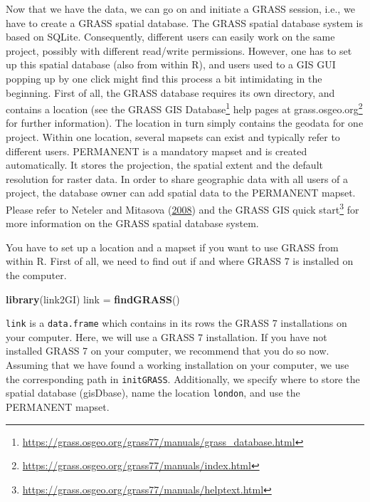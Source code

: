 \documentclass[]{krantz}
\newenvironment{Shaded}{\begin{snugshade}}{\end{snugshade}}
\newcommand{\KeywordTok}[1]{\textcolor[rgb]{0.27,0.27,0.27}{\textbf{#1}}}
\newcommand{\NormalTok}[1]{#1}
\newcommand{\StringTok}[1]{\textcolor[rgb]{0.5,0.5,0.5}{#1}}
\let\rmarkdownfootnote\footnote%
\def\footnote{\protect\rmarkdownfootnote}
\renewcommand{\href}[2]{#2\footnote{\url{#1}}}
\begin{document}
Now that we have the data, we can go on and initiate a GRASS session, i.e., we have to create a GRASS spatial database.
The GRASS spatial database system is based on SQLite.
Consequently, different users can easily work on the same project, possibly with different read/write permissions.
However, one has to set up this spatial database (also from within R), and users used to a GIS GUI popping up by one click might find this process a bit intimidating in the beginning.
First of all, the GRASS database requires its own directory, and contains a location (see the \href{https://grass.osgeo.org/grass77/manuals/grass_database.html}{GRASS GIS Database} help pages at \href{https://grass.osgeo.org/grass77/manuals/index.html}{grass.osgeo.org} for further information).
The location in turn simply contains the geodata for one project.
Within one location, several mapsets can exist and typically refer to different users.
PERMANENT is a mandatory mapset and is created automatically.
It stores the projection, the spatial extent and the default resolution for raster data.
In order to share geographic data with all users of a project, the database owner can add spatial data to the PERMANENT mapset.
Please refer to Neteler and Mitasova (\protect\hyperlink{ref-neteler_open_2008}{2008}) and the \href{https://grass.osgeo.org/grass77/manuals/helptext.html}{GRASS GIS quick start} for more information on the GRASS spatial database system.

You have to set up a location and a mapset if you want to use GRASS from within R.
First of all, we need to find out if and where GRASS 7 is installed on the computer.

\begin{Shaded}
\begin{Highlighting}[]
\KeywordTok{library}\NormalTok{(link2GI)}
\NormalTok{link =}\StringTok{ }\KeywordTok{findGRASS}\NormalTok{() }
\end{Highlighting}
\end{Shaded}

\texttt{link} is a \texttt{data.frame} which contains in its rows the GRASS 7 installations on your computer.
Here, we will use a GRASS 7 installation.
If you have not installed GRASS 7 on your computer, we recommend that you do so now.
Assuming that we have found a working installation on your computer, we use the corresponding path in \texttt{initGRASS}.
Additionally, we specify where to store the spatial database (gisDbase), name the location \texttt{london}, and use the PERMANENT mapset.
\end{document}
